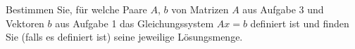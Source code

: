 
Bestimmen Sie, für welche Paare $A$, $b$ von Matrizen $A$ aus Aufgabe 3 und Vektoren $b$ aus Aufgabe 1 das Gleichungssystem $Ax=b$ definiert ist und finden Sie (falls es definiert ist) seine jeweilige Lösungsmenge.
